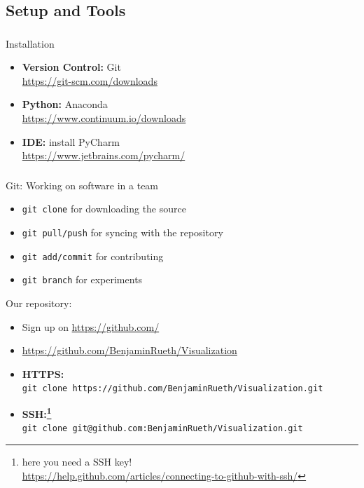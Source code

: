 \documentclass[11pt]{beamer}
\begin{document}
\subsection{Setup and Tools}
\begin{frame}
\frametitle{\insertsubsection}
\begin{block}{Installation}
\begin{itemize}
\item \textbf{Version Control:} Git \\
{\footnotesize\url{https://git-scm.com/downloads}}
\item \textbf{Python:} Anaconda \\
{\footnotesize\url{https://www.continuum.io/downloads}}
\item \textbf{IDE:} install PyCharm \\
{\footnotesize\url{https://www.jetbrains.com/pycharm/}}
\end{itemize}
\end{block}
\end{frame}

\begin{frame}
\frametitle{\insertsubsection}
\begin{block}{Git: Working on software in a team}
\begin{itemize}
\item \texttt{git clone} for downloading the source
\item \texttt{git pull/push} for syncing with the repository
\item \texttt{git add/commit} for contributing
\item \texttt{git branch} for experiments
\end{itemize}
\end{block}

\pause

\begin{block}{Our repository:}
\begin{itemize}
\item Sign up on \url{https://github.com/}
\item \url{https://github.com/BenjaminRueth/Visualization}
\item \textbf{HTTPS:} \\
{\footnotesize\texttt{git clone https://github.com/BenjaminRueth/Visualization.git}}
\item \textbf{SSH:\footnote{here you need a SSH key! \\ {\scriptsize\url{https://help.github.com/articles/connecting-to-github-with-ssh/}}}} \\
{\footnotesize\texttt{git clone git@github.com:BenjaminRueth/Visualization.git}}
\end{itemize}
\end{block}
\end{frame}
\end{document}
